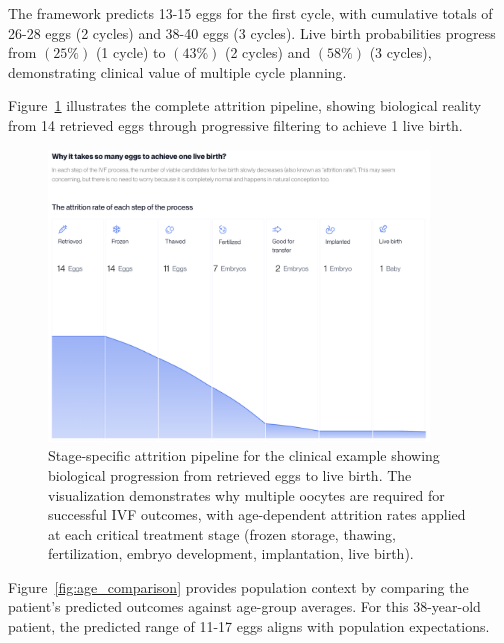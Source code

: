 The framework predicts 13-15 eggs for the first cycle, with cumulative totals of 26-28 eggs (2 cycles) and 38-40 eggs (3 cycles). Live birth probabilities progress from $(25\%)$ (1 cycle) to $(43\%)$ (2 cycles) and $(58\%)$ (3 cycles), demonstrating clinical value of multiple cycle planning.

Figure~\ref{fig:attrition} illustrates the complete attrition pipeline, showing biological reality from 14 retrieved eggs through progressive filtering to achieve 1 live birth.

\begin{figure}[H]
    \centering
    \includegraphics[width=0.90\textwidth]{figures/Attrition.png}
    \caption{Stage-specific attrition pipeline for the clinical example showing biological progression from retrieved eggs to live birth. The visualization demonstrates why multiple oocytes are required for successful IVF outcomes, with age-dependent attrition rates applied at each critical treatment stage (frozen storage, thawing, fertilization, embryo development, implantation, live birth).}
    \label{fig:attrition}
\end{figure}

Figure~\ref{fig:age_comparison} provides population context by comparing the patient's predicted outcomes against age-group averages. For this 38-year-old patient, the predicted range of 11-17 eggs aligns with population expectations.


